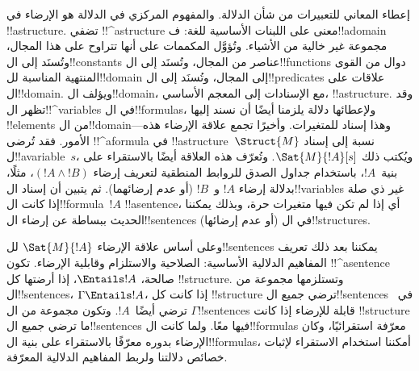 \documentclass[../../../include/open-logic-section]{subfiles}
\begin{document}


إعطاء المعاني للتعبيرات من شأن الدلالة. والمفهوم المركزي في الدلالة
هو الإرضاء في !!a{structure}. تضفي !!^a{structure} معنى على اللبنات
الأساسية للغة: ف!!a{domain} مجموعة غير خالية من الأشياء. وتُؤوَّل
المكممات على أنها تتراوح على هذا المجال، وتُسنَد إلى ال!!{constant}s
عناصر من المجال، وتُسنَد إلى ال!!{function}s دوال من القوى المنتهية
المناسبة لل!!{domain} إلى المجال، وتُسنَد إلى ال!!{predicate}s علاقات على
ال!!{domain}. ويؤلف ال!!{domain}، مع الإسنادات إلى المعجم الأساسي،
!!a{structure}. وقد تظهر ال!!^{variable}s في ال!!{formula}s،
ولإعطائها دلالة يلزمنا أيضًا أن نسند إليها !!{element}s من
ال!!{domain}---وهذا إسناد للمتغيرات. وأخيرًا تجمع علاقة الإرضاء هذه
الأمور. فقد تُرضى !!^a{formula} في !!a{structure}~$\Struct{M}$ نسبة
إلى إسناد ل!!a{variable}~$s$، ويُكتب ذلك $\Sat{M}{!A}[s]$. وتُعرّف
هذه العلاقة أيضًا بالاستقراء على بنية~$!A$، باستخدام جداول الصدق
للروابط المنطقية لتعريف إرضاء $(!A \land !B)$، مثلًا، بدلالة إرضاء
$!A$ و~$!B$ (أو عدم إرضائهما). ثم يتبين أن إسناد ال!!{variable}s
غير ذي صلة إذا كانت ال!!{formula}~$!A$ !!a{sentence}، أي إذا لم تكن
فيها متغيرات حرة، وبذلك يمكننا الحديث ببساطة عن إرضاء ال!!{sentence}s
(أو عدم إرضائها) في ال!!{structure}s.

وعلى أساس علاقة الإرضاء $\Sat{M}{!A}$ لل!!{sentence}s يمكننا بعد
ذلك تعريف المفاهيم الدلالية الأساسية: الصلاحية والاستلزام وقابلية
الإرضاء. تكون !!^a{sentence} صالحة، $\Entails !A$، إذا أرضتها كل
!!{structure}. وتستلزمها مجموعة من ال!!{sentence}s،
$\Gamma \Entails !A$، إذا كانت كل !!{structure} ترضي جميع
ال!!{sentence}s في~$\Gamma$ ترضي أيضًا~$!A$. وتكون مجموعة من
ال!!{sentence}s قابلة للإرضاء إذا كانت !!{structure} ما ترضي جميع
ال!!{sentence}s فيها معًا. ولما كانت ال!!{formula}s معرّفة
استقرائيًا، وكان الإرضاء بدوره معرّفًا بالاستقراء على بنية
ال!!{formula}s، أمكننا استخدام الاستقراء لإثبات خصائص دلالتنا ولربط
المفاهيم الدلالية المعرّفة.
\end{document}

